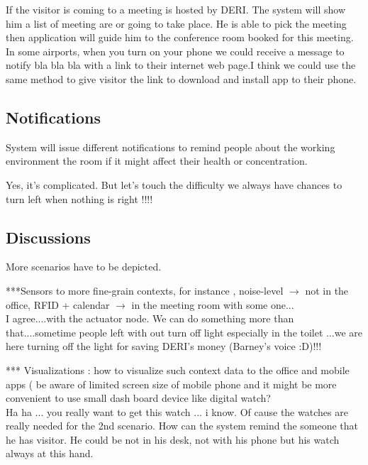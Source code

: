 \documentclass[a4paper, 12pt]{article}
\begin{document}
If the visitor is coming to a meeting is hosted by DERI. The system will show him a list of meeting are or going to take place. He is able to pick the meeting then application will guide him to the conference room booked for this meeting.\\
 

In some airports, when you turn on your phone we could receive a message to notify bla bla bla  with a link to their internet web page.I think we could use the same method to give visitor the link to download and install app to their phone. 
 
\subsection{Notifications}
 System will issue different notifications to remind people about the working environment the room if it might affect their health or concentration.
 
Yes, it's complicated. But let's touch the difficulty we always have chances to turn left when nothing is right !!!!
 
\subsection{Discussions}
 More scenarios have to be depicted.
 
 
 ***Sensors to more fine-grain contexts, for instance , noise-level $\to$ not in the office, RFID + calendar $\to$ in the meeting room with some one...\\

I agree....with the actuator node. We can do something more than that....sometime people left with out turn off light especially in the toilet ...we are here turning off the light for saving DERI's money (Barney's voice :D)!!!
 
 *** Visualizations : how to visualize such context data to the office and mobile apps ( be aware of limited screen size of mobile phone and it might be more convenient to use small dash board device like digital watch?\\

Ha ha ... you really want to get this watch ... i know. Of cause the watches are really needed for the 2nd  scenario. How can the system remind the someone that he has visitor. He could be not in his desk, not with his phone but his watch always at this hand.
\end{document}
